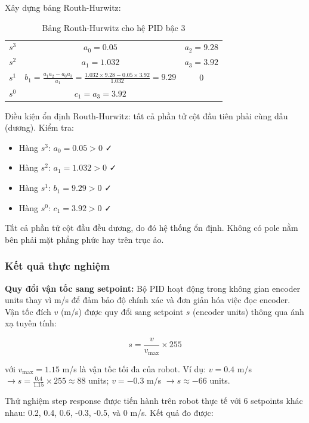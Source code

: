 Xây dựng bảng Routh-Hurwitz:

\begin{table}[h]
\centering
\begin{tabular}{c|cc}
\hline
$s^3$ & $a_0 = 0.05$ & $a_2 = 9.28$ \\
$s^2$ & $a_1 = 1.032$ & $a_3 = 3.92$ \\
$s^1$ & $b_1 = \frac{a_1 a_2 - a_0 a_3}{a_1} = \frac{1.032 \times 9.28 - 0.05 \times 3.92}{1.032} = 9.29$ & $0$ \\
$s^0$ & $c_1 = a_3 = 3.92$ & \\
\hline
\end{tabular}
\caption{Bảng Routh-Hurwitz cho hệ PID bậc 3}
\label{tab:routh}
\end{table}

Điều kiện ổn định Routh-Hurwitz: tất cả phần tử cột đầu tiên phải cùng dấu (dương). Kiểm tra:
\begin{itemize}[nosep]
\item Hàng $s^3$: $a_0 = 0.05 > 0$ ✓
\item Hàng $s^2$: $a_1 = 1.032 > 0$ ✓
\item Hàng $s^1$: $b_1 = 9.29 > 0$ ✓
\item Hàng $s^0$: $c_1 = 3.92 > 0$ ✓
\end{itemize}

Tất cả phần tử cột đầu đều dương, do đó hệ thống ổn định. Không có pole nằm bên phải mặt phẳng phức hay trên trục ảo.

\subsubsection{Kết quả thực nghiệm}

\textbf{Quy đổi vận tốc sang setpoint:} Bộ PID hoạt động trong không gian encoder units thay vì m/s để đảm bảo độ chính xác và đơn giản hóa việc đọc encoder. Vận tốc đích $v$ (m/s) được quy đổi sang setpoint $s$ (encoder units) thông qua ánh xạ tuyến tính:

\begin{equation}
s = \frac{v}{v_{\max}} \times 255
\label{eq:vel_to_pulse}
\end{equation}

với $v_{\max} = 1.15$ m/s là vận tốc tối đa của robot. Ví dụ: $v = 0.4$ m/s $\rightarrow s = \frac{0.4}{1.15} \times 255 \approx 88$ units; $v = -0.3$ m/s $\rightarrow s \approx -66$ units.

Thử nghiệm step response được tiến hành trên robot thực tế với 6 setpoints khác nhau: 0.2, 0.4, 0.6, -0.3, -0.5, và 0 m/s. Kết quả đo được:

